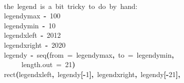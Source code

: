 \documentclass[a4paper]{article}
\newcommand{\hlnumber}[1]{\textcolor[rgb]{0.0823529411764706,0.0784313725490196,0.709803921568627}{#1}}%
\newcommand{\hlfunctioncall}[1]{\textcolor[rgb]{1,0,0}{#1}}%
\newcommand{\hlkeyword}[1]{\textcolor[rgb]{0,0,0}{\textbf{#1}}}%
\newcommand{\hlargument}[1]{\textcolor[rgb]{0.694117647058824,0.247058823529412,0.0196078431372549}{#1}}%
\newcommand{\hlcomment}[1]{\textcolor[rgb]{0.8,0.8,0.8}{#1}}%
\newcommand{\hlassignement}[1]{\textcolor[rgb]{0.215686274509804,0.215686274509804,0.384313725490196}{\textbf{#1}}}%
\newcommand{\hlsymbol}[1]{\textcolor[rgb]{0,0,0}{#1}}%
\newcommand{\hlprompt}[1]{\textcolor[rgb]{0,0,0}{#1}}%
\newcommand{\hlstd}[1]{\textcolor[rgb]{0,0,0}{#1}}%
\newenvironment{Houtput}{\raggedright}{%
%
}
\begin{document}
\begin{Houtput}
\hspace*{\fill}\\
\hlstd{}\ttfamily\noindent
\hlprompt{\usebox{\hlnormalsizeboxgreaterthan}{\ }}\hlcomment{\usebox{\hlnormalsizeboxhash}{\ }the{\ }legend{\ }is{\ }a{\ }bit{\ }tricky{\ }to{\ }do{\ }by{\ }hand:}\mbox{}
\normalfont
\hspace*{\fill}\\
\hlstd{}\ttfamily\noindent
\hlprompt{\usebox{\hlnormalsizeboxgreaterthan}{\ }}\hlsymbol{legendymax}{\ }\hlassignement{\usebox{\hlnormalsizeboxlessthan}-}{\ }\hlnumber{100}\mbox{}
\normalfont
\hspace*{\fill}\\
\hlstd{}\ttfamily\noindent
\hlprompt{\usebox{\hlnormalsizeboxgreaterthan}{\ }}\hlsymbol{legendymin}{\ }\hlassignement{\usebox{\hlnormalsizeboxlessthan}-}{\ }\hlnumber{10}\mbox{}
\normalfont
\hspace*{\fill}\\
\hlstd{}\ttfamily\noindent
\hlprompt{\usebox{\hlnormalsizeboxgreaterthan}{\ }}\hlsymbol{legendxleft}{\ }\hlassignement{\usebox{\hlnormalsizeboxlessthan}-}{\ }\hlnumber{2012}\mbox{}
\normalfont
\hspace*{\fill}\\
\hlstd{}\ttfamily\noindent
\hlprompt{\usebox{\hlnormalsizeboxgreaterthan}{\ }}\hlsymbol{legendxright}{\ }\hlassignement{\usebox{\hlnormalsizeboxlessthan}-}{\ }\hlnumber{2020}\mbox{}
\normalfont
\hspace*{\fill}\\
\hlstd{}\ttfamily\noindent
\hlprompt{\usebox{\hlnormalsizeboxgreaterthan}{\ }}\hlsymbol{legendy}{\ }\hlassignement{\usebox{\hlnormalsizeboxlessthan}-}{\ }\hlfunctioncall{seq}\hlkeyword{(}\hlargument{from}{\ }\hlargument{=}{\ }\hlsymbol{legendymax}\hlkeyword{,}{\ }\hlargument{to}{\ }\hlargument{=}{\ }\hlsymbol{legendymin}\hlkeyword{,}\hspace*{\fill}\\
\hlstd{}\hlprompt{{\ }}{\ }{\ }{\ }{\ }\hlargument{length.out}{\ }\hlargument{=}{\ }\hlnumber{21}\hlkeyword{)}\mbox{}
\normalfont
\hspace*{\fill}\\
\hlstd{}\ttfamily\noindent
\hlprompt{\usebox{\hlnormalsizeboxgreaterthan}{\ }}\hlfunctioncall{rect}\hlkeyword{(}\hlsymbol{legendxleft}\hlkeyword{,}{\ }\hlsymbol{legendy}\hlkeyword{[}\hlkeyword{-}\hlnumber{1}\hlkeyword{]}\hlkeyword{,}{\ }\hlsymbol{legendxright}\hlkeyword{,}{\ }\hlsymbol{legendy}\hlkeyword{[}\hlkeyword{-}\hlnumber{21}\hlkeyword{]}\hlkeyword{,}\hspace*{\fill}\\

\end{Houtput}
\end{document}
